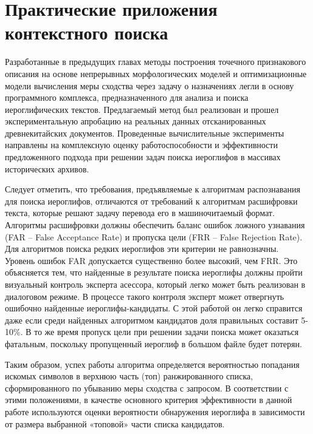 \chapter{Практические приложения контекстного поиска}\label{ch:ch5}
Разработанные в предыдущих главах методы построения точечного признакового описания на основе непрерывных морфологических моделей и оптимизационные модели вычисления меры сходства через задачу о назначениях легли в основу программного комплекса, предназначенного для анализа и поиска иероглифических текстов. Предлагаемый метод был реализован и прошел экспериментальную апробацию на реальных данных отсканированных древнекитайских документов. Проведенные вычислительные эксперименты направлены на комплексную оценку работоспособности и эффективности предложенного подхода при решении задач поиска иероглифов в массивах исторических архивов.

Следует отметить, что требования, предъявляемые к алгоритмам распознавания для поиска иероглифов, отличаются от требований к алгоритмам расшифровки текста, которые решают задачу перевода его в машиночитаемый формат. Алгоритмы расшифровки должны обеспечить баланс ошибок ложного узнавания (FAR – False Acceptance Rate) и пропуска цели (FRR – False Rejection Rate). Для алгоритмов поиска редких иероглифов эти критерии не равнозначны. Уровень ошибок FAR допускается существенно более высокий, чем FRR. Это объясняется тем, что найденные в результате поиска иероглифы должны пройти визуальный контроль эксперта асессора, который легко может быть реализован в диалоговом режиме. В процессе такого контроля эксперт может отвергнуть ошибочно найденные иероглифы-кандидаты. С этой работой он легко справится даже если среди найденных алгоритмом кандидатов доля правильных составит 5-10\%. В то же время пропуск цели при решении задачи поиска может оказаться фатальным, поскольку пропущенный иероглиф в большом файле будет потерян.

Таким образом, успех работы алгоритма определяется вероятностью попадания искомых символов в верхнюю часть (топ) ранжированного списка, сформированного по убыванию меры сходства с запросом. В соответствии с этими положениями, в качестве основного критерия эффективности в данной работе используются оценки вероятности обнаружения иероглифа в зависимости от размера выбранной «топовой» части списка кандидатов.


